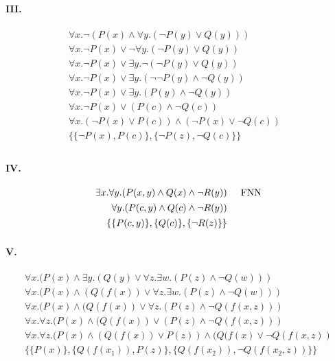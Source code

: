 \documentclass[10pt,a4paper]{article}
\begin{document}
\begin{multicols}{2}
\paragraph{III.} 
\begin{align*}
\forall x. \lnot(P(x) \land \forall y.(\lnot P(y) \lor Q(y))) & \\[1pt]
\forall x. \lnot P(x) \lor \lnot\forall y.(\lnot P(y) \lor Q(y)) & \\[1pt]
\forall x. \lnot P(x) \lor \exists y.\lnot(\lnot P(y) \lor Q(y)) & \\[1pt]
\forall x. \lnot P(x) \lor \exists y.(\lnot\lnot P(y) \land \lnot Q(y))& \\[1pt]
\forall x. \lnot P(x) \lor \exists y. (P(y) \land \lnot Q(y))\\[1pt]
\forall x.\lnot P(x) \lor  (P(c) \land \lnot Q(c)) \\[1pt]
\forall x. (\lnot P(x) \lor  P(c)) \land (\lnot P(x)\lor \lnot Q(c))  \\[1pt]
\{\{\lnot P(x), P(c)\},\{\lnot P(z), \lnot Q(c)\}\} \\[1pt]
\end{align*}
\vfill\null
\columnbreak
\paragraph{IV.}
\begin{align*}
 \exists x. \forall y. (P(x,y) \land Q(x) \land \lnot R(y))&\hspace{5mm}\text{FNN} \\[1pt]
\forall y. (P(c,y) \land Q(c) \land \lnot R(y)) \\[1pt]
\{\{P(c,y)\}, \{Q(c)\}, \{\lnot R(z)\}\}\\[1pt]
\end{align*}
\vfill\null
\end{multicols}

\paragraph{V.}
\begin{align*}
\forall x. (P(x) \land \exists y. (Q(y) \lor \forall z. \exists w. (P(z) \land \lnot Q(w))) \\[1pt]
\forall x. (P(x) \land (Q(f(x)) \lor \forall z. \exists w. (P(z) \land \lnot Q(w))) \\[1pt]
\forall x. (P(x) \land (Q(f(x)) \lor \forall z. (P(z) \land \lnot Q(f(x,z))) \\[1pt]
\forall x.\forall z.  (P(x) \land (Q(f(x)) \lor (P(z) \land \lnot Q(f(x,z))) \\[1pt]
\forall x.\forall z.  (P(x) \land (Q(f(x)) \lor P(z)) \land (Q(f(x) \lor \lnot Q(f(x,z)) \\[1pt]
\{\{ P(x)\} , \{Q(f(x_1)), P(z)\} , \{Q(f(x_2)), \lnot Q(f(x_2,z))\} \}
\end{align*}
       
\end{document}
